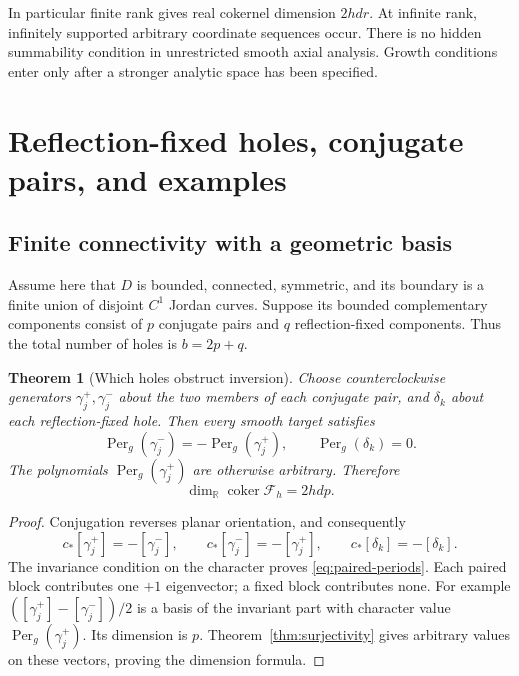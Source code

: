 \documentclass[11pt,a4paper]{article}
\numberwithin{equation}{section}
\newtheorem{theorem}{Theorem}[section]
\theoremstyle{definition}
\theoremstyle{remark}
\newcommand{\R}{\mathbb R}
\newcommand{\Fu}{\mathcal F_h}
\newcommand{\Per}{\operatorname{Per}}
\begin{document}
In particular finite rank gives real cokernel dimension $2hdr$. At infinite
rank, infinitely supported arbitrary coordinate sequences occur. There is no
hidden summability condition in unrestricted smooth axial analysis. Growth
conditions enter only after a stronger analytic space has been specified.

\section{Reflection-fixed holes, conjugate pairs, and examples}
\label{sec:holes}

\subsection{Finite connectivity with a geometric basis}

Assume here that $D$ is bounded, connected, symmetric, and its boundary is a
finite union of disjoint $C^1$ Jordan curves. Suppose its bounded complementary
components consist of $p$ conjugate pairs and $q$ reflection-fixed components.
Thus the total number of holes is $b=2p+q$.

\begin{theorem}[Which holes obstruct inversion]\label{thm:holes}
Choose counterclockwise generators $\gamma_j^+,\gamma_j^-$ about the two
members of each conjugate pair, and $\delta_k$ about each reflection-fixed
hole. Then every smooth target satisfies
\begin{equation}\label{eq:paired-periods}
 \Per_g(\gamma_j^-)=-\Per_g(\gamma_j^+),
 \qquad \Per_g(\delta_k)=0.
\end{equation}
The polynomials $\Per_g(\gamma_j^+)$ are otherwise arbitrary. Therefore
\begin{equation}\label{eq:finite-dimension}
 \dim_\R\operatorname{coker}\Fu=2hdp.
\end{equation}
\end{theorem}
\begin{proof}
Conjugation reverses planar orientation, and consequently
\[
 c_*[\gamma_j^+]=-[\gamma_j^-],\qquad
 c_*[\gamma_j^-]=-[\gamma_j^+],\qquad
 c_*[\delta_k]=-[\delta_k].
\]
The invariance condition on the character proves \eqref{eq:paired-periods}.
Each paired block contributes one $+1$ eigenvector; a fixed block contributes
none. For example $([\gamma_j^+]-[\gamma_j^-])/2$ is a basis of the invariant
part with character value $\Per_g(\gamma_j^+)$. Its dimension is $p$.
Theorem~\ref{thm:surjectivity} gives arbitrary values on these vectors,
proving the dimension formula.
\end{proof}
\end{document}
